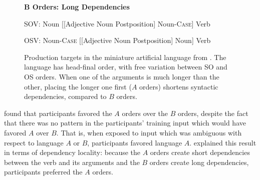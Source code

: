 \begin{figure}
	\textbf{B Orders: Long Dependencies}

	SOV: Noun [[Adjective Noun Postposition] Noun-\textsc{Case}] Verb

	OSV: Noun-\textsc{Case} [[Adjective Noun Postposition] Noun] Verb
%
%
			\caption{Production targets in the miniature artificial language from \cite{fedzechkina-human-2017}. The language has head-final order, with free variation between SO and OS orders. When one of the arguments is much longer than the other, placing the longer one first ($A$ orders) shortens syntactic dependencies, compared to $B$ orders.}\label{tab:artificial}

\end{figure}

\citet{fedzechkina-human-2017} found that participants favored the $A$ orders over the $B$ orders, despite the fact that there was no pattern in the participants' training input which would have favored $A$ over $B$. That is, when exposed to input which was ambiguous with respect to language $A$ or $B$, participants favored language $A$. \citet{fedzechkina-human-2017} explained this result in terms of dependency locality: because the $A$ orders create short dependencies between the verb and its arguments and the $B$ orders create long dependencies, participants preferred the $A$ orders.


